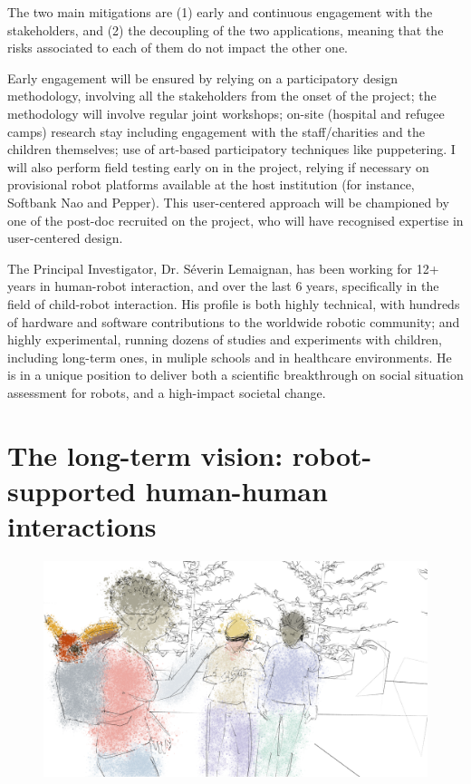 \documentclass[11pt]{report}
\begin{document}
The two main mitigations are (1) early and continuous engagement with the
stakeholders, and (2) the decoupling of the two applications, meaning that the
risks associated to each of them do not impact the other one.

Early engagement will be ensured by relying on a participatory design
methodology, involving all the stakeholders from the onset of the project; the
methodology will involve regular joint workshops; on-site (hospital and refugee
camps) research stay including engagement with the staff/charities and the
children themselves; use of art-based participatory techniques like puppetering.
I will also perform field testing early on in the project, relying if necessary
on provisional robot platforms available at the host institution (for instance,
Softbank Nao and Pepper). This user-centered approach will be championed by one
of the post-doc recruited on the project, who will have recognised expertise in
user-centered design.


The Principal Investigator, Dr.  Séverin Lemaignan, has been working for 12+
years in human-robot interaction, and over the last 6 years, specifically in the
field of child-robot interaction.  His profile is both highly technical, with
hundreds of hardware and software contributions to the worldwide robotic
community; and highly experimental, running dozens of studies and experiments
with children, including long-term ones, in muliple schools and in healthcare
environments. He is in a unique position to deliver both a scientific
breakthrough on social situation assessment for robots, and a high-impact
societal change.

\section{The long-term vision: robot-supported human-human interactions}


\begin{figure}[!htbp]
    \centering
    \includegraphics[width=0.9\linewidth]{figs/render5-colors.png}
\end{figure}
\end{document}
